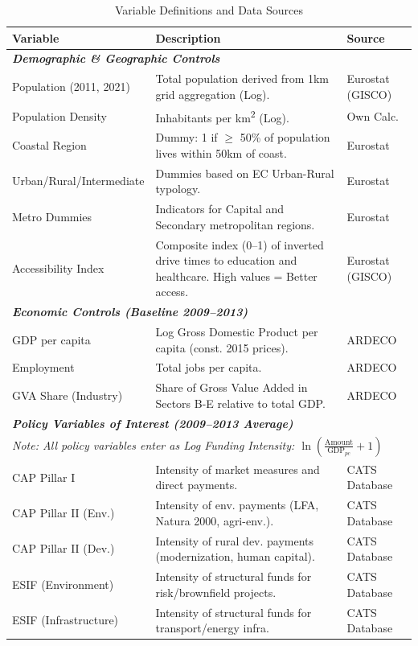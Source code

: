 \documentclass[
	a4paper, %
	10pt, %
]{LTJournalArticle}
\begin{document}
\begin{table}[H]
\centering
\caption{Variable Definitions and Data Sources}
\label{tab:variables}
\scriptsize %
\renewcommand{\arraystretch}{1.3} 
\begin{tabular}{p{3.5cm} p{8cm} p{2.5cm}}
\toprule
\textbf{Variable} & \textbf{Description} & \textbf{Source} \\ 
\midrule
\multicolumn{3}{l}{\textit{\textbf{Demographic \& Geographic Controls}}} \\
Population (2011, 2021) & Total population derived from 1km grid aggregation (Log). & Eurostat (GISCO) \\
Population Density & Inhabitants per km\textsuperscript{2} (Log). & Own Calc. \\
Coastal Region & Dummy: 1 if $\geq$ 50\% of population lives within 50km of coast. & Eurostat \\
Urban/Rural/Intermediate & Dummies based on EC Urban-Rural typology. & Eurostat \\
Metro Dummies & Indicators for Capital and Secondary metropolitan regions. & Eurostat \\
Accessibility Index & Composite index (0--1) of inverted drive times to education and healthcare. High values = Better access. & Eurostat (GISCO) \\

\midrule
\multicolumn{3}{l}{\textit{\textbf{Economic Controls (Baseline 2009--2013)}}} \\
GDP per capita & Log Gross Domestic Product per capita (const. 2015 prices). & ARDECO \\
Employment & Total jobs per capita. & ARDECO \\
GVA Share (Industry) & Share of Gross Value Added in Sectors B-E relative to total GDP. & ARDECO \\

\midrule
\multicolumn{3}{l}{\textit{\textbf{Policy Variables of Interest (2009--2013 Average)}}} \\
\multicolumn{3}{p{14cm}}{\textit{Note: All policy variables enter as Log Funding Intensity: $ \ln(\frac{\text{Amount}}{\text{GDP}_{pc}} + 1) $}} \\
CAP Pillar I & Intensity of market measures and direct payments. & CATS Database \\
CAP Pillar II (Env.) & Intensity of env. payments (LFA, Natura 2000, agri-env.). & CATS Database \\
CAP Pillar II (Dev.) & Intensity of rural dev. payments (modernization, human capital). & CATS Database \\
ESIF (Environment) & Intensity of structural funds for risk/brownfield projects. & CATS Database \\
ESIF (Infrastructure) & Intensity of structural funds for transport/energy infra. & CATS Database \\
\bottomrule
\end{tabular}
\end{table}
\end{document}
